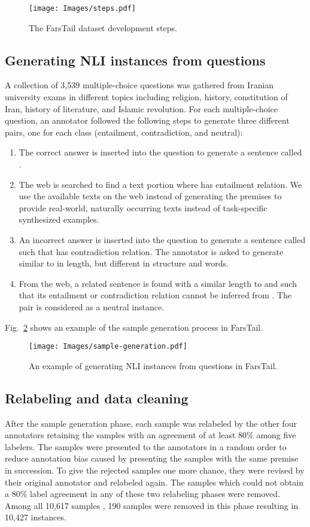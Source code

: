 \documentclass[preprint,12pt]{elsarticle}
\begin{document}
\begin{figure}[t!]
    \centering
    \texttt{[image: Images/steps.pdf]}
    \caption{The FarsTail dataset development steps.}
    \label{fig:farstail-steps}
\end{figure}

\subsection{Generating NLI instances from questions}
\label{subsec:generate}
A collection of 3,539 multiple-choice questions was gathered from Iranian university exams in different topics including religion, history, constitution of Iran, history of literature, and Islamic revolution. For each multiple-choice question, an annotator followed the following steps to generate three different pairs, one for each class (entailment, contradiction, and neutral):
\begin{enumerate}
    \item The correct answer is inserted into the question to generate a sentence called . 
    \item The web is searched to find a text portion  where   has entailment relation. We use the available texts on the web instead of generating the premises to provide real-world, naturally occurring texts instead of task-specific synthesized examples. 
    \item An incorrect answer is inserted into the question to generate a sentence called  such that  has contradiction relation. The annotator is asked to generate  similar to  in length, but different in structure and words. 
    \item From the web, a related sentence  is found with a similar length to  and  such that its entailment or contradiction relation cannot be inferred from . The pair  is considered as a neutral instance.
\end{enumerate}
Fig.~\ref{fig:generation} shows an example of the sample generation process in FarsTail. 

\begin{figure}[t!]
    \centering
    \texttt{[image: Images/sample-generation.pdf]}
    \caption{An example of generating NLI instances from questions in FarsTail.}
    \label{fig:generation}
\end{figure}

\subsection{Relabeling and data cleaning}
\label{subsec:relabel}
After the sample generation phase, each sample was relabeled by the other four annotators retaining the samples with an agreement of at least 80\% among five labelers. The samples were presented to the annotators in a random order to reduce annotation bias caused by presenting the samples with the same premise in succession. To give the rejected samples one more chance, they were revised by their original annotator and relabeled again. The samples which could not obtain a 80\% label agreement in any of these two relabeling phases were removed. Among all 10,617 samples , 190 samples were removed in this phase resulting in 10,427 instances.
\end{document}
